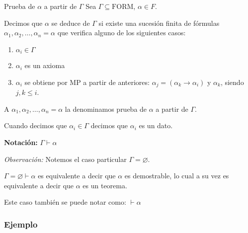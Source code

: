 \begin{definicion}{Prueba de $\alpha$ a partir de $\Gamma$}{}
    Sea $\Gamma \subseteq \mathrm{FORM}$, $\alpha \in F$.

    \medskip

    Decimos que $\alpha$ se deduce de $\Gamma$ si existe una sucesión finita
    de fórmulas $\alpha_1, \alpha_2, \dotsc, \alpha_n = \alpha$ que verifica
    alguno de los siguientes casos:

    \begin{center}
        \begin{enumerate}[%
                        labelindent=*,
                        style=multiline,
                        leftmargin=*,
                        align=left,
                        leftmargin=2\parindent,
                        label=Caso \arabic*)]
            \item $\alpha_i \in \Gamma$ %
            \item $\alpha_i$ es un axioma %
            \item $\alpha_i$ se obtiene por MP a partir de anteriores:
                $\alpha_j = (\alpha_k \to \alpha_i)$ y $\alpha_k$, siendo 
                $j, k \leq i$.
        \end{enumerate}
    \end{center}

    A $\alpha_1, \alpha_2, \dotsc, \alpha_n = \alpha$ la denominamos
    prueba de $\alpha$ a partir de $\Gamma$.

    Cuando decimos que $\alpha_i \in \Gamma$ decimos que $\alpha_i$ es un 
    dato.

    \bigskip
    \textbf{Notación:}
    $\Gamma \vdash \alpha$
    
\end{definicion}


\bigskip
\textit{Observación:}
Notemos el caso particular $\Gamma = \varnothing$.

\bigskip%

$\Gamma = \varnothing \vdash \alpha$ es equivalente a decir que $\alpha$ es
demostrable, lo cual a su vez es equivalente a decir que $\alpha$ es un
teorema. 

Este caso también se puede notar como: $\vdash \alpha$


\subsubsection{Ejemplo}

